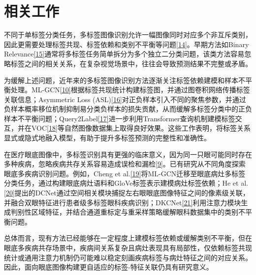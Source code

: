 \section{相关工作}\label{ux76f8ux5173ux5de5ux4f5c}

\label{a.ux591aux6807ux7b7eux56feux50cfux8bc6ux522b}

不同于单标签分类任务，多标签图像识别允许一幅图像同时对应多个非互斥类别，因此更需要处理标签共现、标签依赖和类别不平衡等问题\hyperref[_Ref213949872]{{[}14{]}}。早期方法如Binary Relevance\hyperref[_Ref213949896]{{[}15{]}}通常将多标签任务简单拆分为多个独立二分类问题，该类方法容易忽略标签之间的相关关系，在复杂视觉场景中，往往会导致预测结果不完整或矛盾。

为缓解上述问题，近年来的多标签图像识别方法逐渐关注标签依赖建模和样本不平衡处理。ML-GCN\hyperref[_Ref213949382]{{[}10{]}}根据标签共现统计构建标签图，并通过图卷积网络传播标签关联信息；Asymmetric Loss (ASL)\hyperref[_Ref213949927]{{[}16{]}}对正负样本引入不同的聚焦参数，并通过负样本概率移位机制抑制易分类负样本的损失贡献，从而缓解多标签分类中的正负样本不平衡问题；Query2Label\hyperref[_Ref213950246]{{[}17{]}}进一步利用Transformer查询机制建模标签交互，并在VOC\hyperref[_Ref213950282]{{[}18{]}}等自然图像数据集上取得良好效果。这些工作表明，将标签关系显式或隐式地融入模型，有助于提升多标签预测的完整性和准确性。

在医疗眼底图像中，多标签识别具有更强的临床意义，因为同一只眼可能同时存在多种疾病，忽略疾病共存关系容易造成误检和漏检\hyperref[_Ref213949362]{{[}9{]}}。已有研究从不同角度探索眼底多疾病识别问题。例如，Cheng et al.\hyperref[_Ref213950349]{{[}19{]}}将ML-GCN迁移至眼底病灶多标签分类任务，通过构建眼底病灶语料和GloVe标签表示建模病灶标签依赖；He et al.\hyperref[_Ref213950338]{{[}20{]}}提出的DCNet通过空间相关模块捕捉左右眼眼底图像特征之间的像素级关联，并融合双眼特征进行患者级多标签眼科疾病识别；DKCNet\hyperref[_Ref213950343]{{[}21{]}}利用注意力模块生成判别性区域特征，并结合通道重标定与重采样策略缓解眼科数据集中的类别不平衡问题。

总体而言，现有方法已经能够在一定程度上建模标签依赖或缓解类别不平衡，但在眼底多疾病共存场景中，疾病间关系复杂且病灶表现具有局部性，仅依赖标签共现统计或通用注意力机制仍可能难以稳定刻画疾病标签与病灶特征之间的对应关系。因此，面向眼底图像构建更自适应的标签-特征关联仍具有研究意义。

\label{b.ux57dfux9002ux5e94ux57dfux6cdbux5316ux4e0eux5355ux57dfux6cdbux5316}

